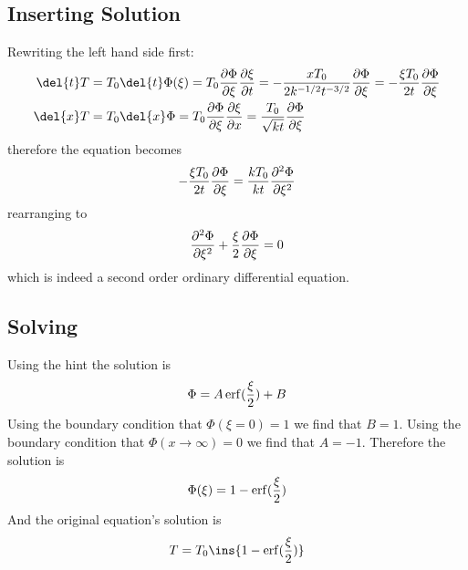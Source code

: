 \subsection{Inserting Solution}
Rewriting the left hand side first:
\begin{align}
	\del{t}T &= T_0 \del{t}\Phi(\xi) = T_0 \pdv{\Phi}{\xi}\pdv{\xi}{t} = -\frac{xT_0}{2k^{-1/2}t^{-3/2}}\pdv{\Phi}{\xi} = -\frac{\xi T_0}{2t}\pdv{\Phi}{\xi} \\
	\del{x}T &= T_0\del{x}\Phi=T_0\pdv{\Phi}{\xi}\pdv{\xi}{x} = \frac{T_0}{\sqrt{kt}}\pdv{\Phi}{\xi}
\end{align}
therefore the equation becomes
\begin{equation}
	-\frac{\xi T_0}{2t}\pdv{\Phi}{\xi} = \frac{kT_0}{kt}\pdv[2]{\Phi}{\xi}
\end{equation}
rearranging to
\begin{equation}
	\pdv[2]{\Phi}{\xi}+\frac{\xi}{2}\pdv{\Phi}{\xi}=0
\end{equation}
which is indeed a second order ordinary differential equation.
\subsection{Solving}
Using the hint the solution is
\begin{equation}
	\Phi = A\erf(\frac{\xi}{2})+B
\end{equation}
Using the boundary condition that \(\Phi(\xi=0)=1\) we find that \(B=1\). Using the boundary condition that \(\Phi(x\rightarrow\infty)=0\) we find that \(A=-1\). Therefore the solution is
\begin{equation}
	\Phi(\xi) = 1-\erf(\frac{\xi}{2})
\end{equation}
And the original equation's solution is
\begin{equation}\label{thesolution}
	T = T_0\ins{1-\erf(\frac{\xi}{2})}
\end{equation}
